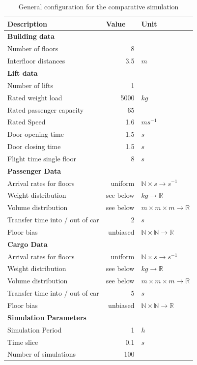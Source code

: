\begin{table}[]
\centering
\begin{tabular}{lrl}
\textbf{Description} \hspace{5cm}   & \multicolumn{1}{l}{\textbf{Value}}   & \textbf{Unit}   \\
\hline
\multicolumn{3}{l}{\textbf{Building data}} \\
Number of floors & 8 &        \\
Interfloor distances & 3.5 & $m$\\
\hline
\multicolumn{3}{l}{\textbf{Lift data}}     \\
Number of lifts & 1 & \\
Rated weight load & 5000 & $kg$\\
Rated passenger capacity & 65 & \\
Rated Speed & 1.6 & $ms^{-1}$ \\
Door opening time & 1.5 & $s$\\
Door closing time & 1.5 & $s$\\
Flight time single floor & 8 & $s$\\
\hline
\multicolumn{3}{l}{\textbf{Passenger Data}}\\
Arrival rates for floors & uniform & $ \mathbb{N} \times s \rightarrow s^{-1}$\\
Weight distribution & see below & $kg \rightarrow \mathbb{R}$\\
Volume distribution & see below  & $m \times m \times m \rightarrow \mathbb{R} $\\
Transfer time into / out of car & 2 & $s$\\
Floor bias & unbiased & $ \mathbb{N} \times \mathbb{N} \rightarrow \mathbb{R} $ \\
\hline
\multicolumn{3}{l}{\textbf{Cargo Data}}\\
Arrival rates for floors & uniform & $\mathbb{N} \times s \rightarrow s^{-1}$\\
Weight distribution & see below & $kg \rightarrow \mathbb{R}$\\
Volume distribution & see below  & $m \times m \times m \rightarrow \mathbb{R} $\\
Transfer time into / out of car & 5 & $s$\\
Floor bias & unbiased & $ \mathbb{N} \times \mathbb{N} \rightarrow \mathbb{R} $ \\
\hline
\multicolumn{3}{l}{\textbf{Simulation Parameters}}\\
Simulation Period & 1 & $h$\\
Time slice & 0.1 & $s$\\
Number of simulations & 100 & \\
\end{tabular}
\caption{\label{tab:design:simulationconfig} General configuration for the comparative simulation}
\end{table}

